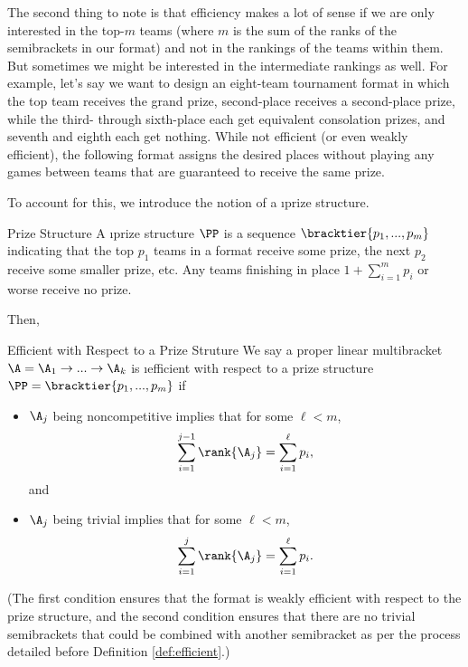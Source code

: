 {    The second thing to note is that efficiency makes a lot of sense if we are only interested in the top-$m$ teams (where $m$ is the sum of the ranks of the semibrackets in our format) and not in the rankings of the teams within them. But sometimes we might be interested in the intermediate rankings as well. For example, let's say we want to design an eight-team tournament format in which the top team receives the grand prize, second-place receives a second-place prize, while the third- through sixth-place each get equivalent consolation prizes, and seventh and eighth each get nothing. While not efficient (or even weakly efficient), the following format assigns the desired places without playing any games between teams that are guaranteed to receive the same prize.


    To account for this, we introduce the notion of a \i{prize structure}.
    
    \begin{definition}{Prize Structure}{}
        A \i{prize structure} $\PP$ is a sequence $\bracktier{p_1, ..., p_m}$ indicating that the top $p_1$ teams in a format receive some prize, the next $p_2$ receive some smaller prize, etc. Any teams finishing in place $1 + \sum_{i=1}^m p_i$ or worse receive no prize.
    \end{definition}

    Then,

    \begin{definition}{Efficient with Respect to a Prize Struture}{}
        We say a proper linear multibracket $\A = \A_1 \to ... \to \A_k$ is \i{efficient with respect to a prize structure} $\PP = \bracktier{p_1, ..., p_m}$ if
        \begin{itemize}
            \item $\A_j$ being noncompetitive implies that for some $\ell < m$, $$\sum_{i=1}^{j-1} \rank {\A_j} = \sum_{i=1}^\ell p_i,$$
                         and
            \item $\A_j$ being trivial implies that for some $\ell < m$, $$\sum_{i=1}^{j} \rank {\A_j} = \sum_{i=1}^\ell p_i.$$
        \end{itemize}
    \end{definition}

    (The first condition ensures that the format is weakly efficient with respect to the prize structure, and the second condition ensures that there are no trivial semibrackets that could be combined with another semibracket as per the process detailed before Definition \ref{def:efficient}.)

}
